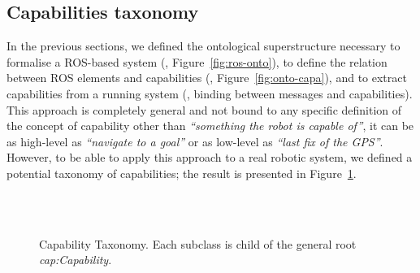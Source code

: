 \subsection{Capabilities taxonomy}
In the previous sections, we defined the ontological superstructure necessary to formalise a ROS-based system (\ie, Figure~\ref{fig:ros-onto}), to define the relation between ROS elements and capabilities (\ie, Figure~\ref{fig:onto-capa}), and to extract capabilities from a running system (\ie, binding between messages and capabilities). This approach is completely general and not bound to any specific definition of the concept of capability other than \textit{``something the robot is capable of''}, it can be as high-level as \textit{``navigate to a goal''} or as low-level as \textit{``last fix of the GPS''}. However, to be able to apply this approach to a real robotic system, we defined a potential taxonomy of capabilities; the result is presented in Figure~\ref{fig:taxo}.

\begin{figure}
    \myfloatalign
     \\
     \\
    \caption[Capability Taxonomy.]{Capability Taxonomy. Each subclass is child of the general root \textit{cap:Capability}.}\label{fig:taxo}
\end{figure}

